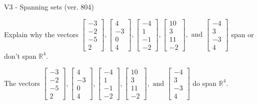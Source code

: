 \begin{exercise}
  \begin{exerciseTitle}V3 - Spanning sets (ver. 804)\end{exerciseTitle}
  \begin{exerciseStatement}
    Explain why the vectors \(\left[\begin{array}{r}
-3 \\
-2 \\
-5 \\
2
\end{array}\right] , \left[\begin{array}{r}
4 \\
-3 \\
0 \\
4
\end{array}\right] , \left[\begin{array}{r}
-4 \\
1 \\
-1 \\
-2
\end{array}\right] , \left[\begin{array}{r}
10 \\
3 \\
11 \\
-2
\end{array}\right] , \text{ and } \left[\begin{array}{r}
-4 \\
3 \\
-3 \\
4
\end{array}\right]\) span or don't span \(\mathbb{R}^4\). 
	


  \end{exerciseStatement}
  \begin{exerciseAnswer}
   The vectors \(\left[\begin{array}{r}
-3 \\
-2 \\
-5 \\
2
\end{array}\right] , \left[\begin{array}{r}
4 \\
-3 \\
0 \\
4
\end{array}\right] , \left[\begin{array}{r}
-4 \\
1 \\
-1 \\
-2
\end{array}\right] , \left[\begin{array}{r}
10 \\
3 \\
11 \\
-2
\end{array}\right] , \text{ and } \left[\begin{array}{r}
-4 \\
3 \\
-3 \\
4
\end{array}\right]\) 
  	 do  
	span \(\mathbb{R}^4\).
  



\end{exerciseAnswer}
\end{exercise}
